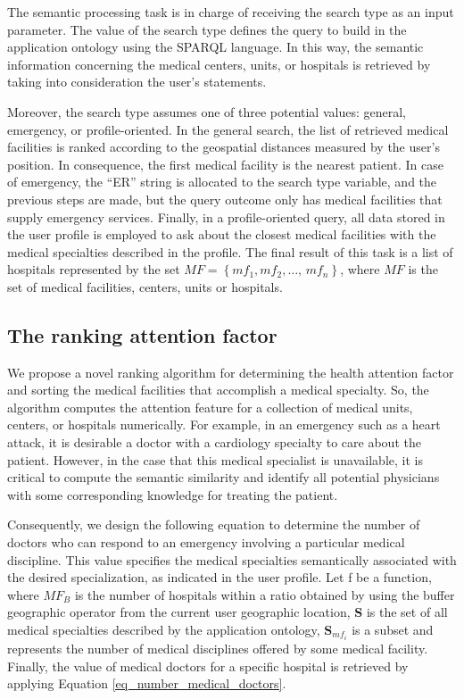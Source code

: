 \documentclass[sustainability,article,submit,pdftex,moreauthors]{Definitions/mdpi}
\begin{document}
The semantic processing task is in charge of receiving the search type as an input parameter. The value of the search type defines the query to build in the application ontology using the SPARQL language. In this way, the semantic information concerning the medical centers, units, or hospitals is retrieved by taking into consideration the user’s statements.

Moreover, the search type assumes one of three potential values: general, emergency, or profile-oriented. In the general search, the list of retrieved medical facilities is ranked according to the geospatial distances measured by the user’s position. In consequence, the first medical facility is the nearest patient. In case of emergency, the “ER” string is allocated to the search type variable, and the previous steps are made, but the query outcome only has medical facilities that supply emergency services. Finally, in a profile-oriented query, all data stored in the user profile is employed to ask about the closest medical facilities with the medical specialties described in the profile. The final result of this task is a list of hospitals represented by the set $MF=\left\{mf_{1},mf_{2},\dots,\,mf_{n}\right\}$, where $MF$ is the set of medical facilities, centers, units or hospitals.

\subsection{The ranking attention factor}

We propose a novel ranking algorithm for determining the health attention factor and sorting the medical facilities that accomplish a medical specialty. So, the algorithm computes the attention feature for a collection of medical units, centers, or hospitals numerically. For example, in an emergency such as a heart attack, it is desirable a doctor with a cardiology specialty to care about the patient. However, in the case that this medical specialist is unavailable, it is critical to compute the semantic similarity and identify all potential physicians with some corresponding knowledge for treating the patient. 

Consequently, we design the following equation to determine the number of doctors who can respond to an emergency involving a particular medical discipline. This value specifies the medical specialties semantically associated with the desired specialization, as indicated in the user profile. Let {f} be a function, where $MF_B$ is the number of hospitals within a ratio obtained by using the buffer geographic operator from the current user geographic location, \textbf{S} is the set of all medical specialties described by the application ontology, $\textbf{S}_{mf_{i}}$ is a subset and represents the number of medical disciplines offered by some medical facility. Finally, the value of medical doctors for a specific hospital is retrieved by applying Equation \ref{eq_number_medical_doctors}.
\end{document}
